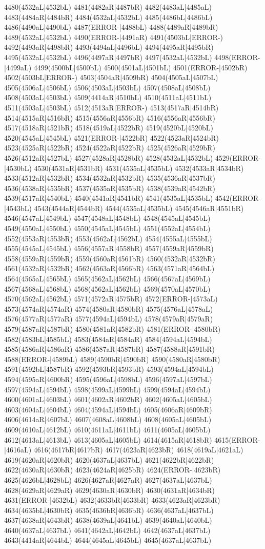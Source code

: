 4480(4532aL|4532bL) 4481(4482aR|4487bR) 4482(4483aL|4485aL) 4483(4484aR|4484bR) 4484(4532aL|4532bL) 4485(4486bL|4486bL) 4486(4490aL|4490bL) 4487(ERROR-|4488bL) 4488(4489aR|4489bR) 4489(4532aL|4532bL) 4490(ERROR-|4491aR) 4491(4503bL|ERROR-) 4492(4493aR|4498bR) 4493(4494aL|4496bL) 4494(4495aR|4495bR) 4495(4532aL|4532bL) 4496(4497aR|4497bR) 4497(4532aL|4532bL) 4498(ERROR-|4499aL) 4499(4500bL|4500bL) 4500(4501aL|4501bL) 4501(ERROR-|4502bR) 4502(4503bL|ERROR-) 4503(4504aR|4509bR) 4504(4505aL|4507bL) 4505(4506aL|4506bL) 4506(4503aL|4503bL) 4507(4508aL|4508bL) 4508(4503aL|4503bL) 4509(4414aR|4510bL) 4510(4511aL|4511bL) 4511(4503aL|4503bL) 4512(4513aR|ERROR-) 4513(4517aR|4514bR) 4514(4515aR|4516bR) 4515(4556aR|4556bR) 4516(4556aR|4556bR) 4517(4518aR|4521bR) 4518(4519aL|4522bR) 4519(4520bL|4520bL) 4520(4545aL|4545bL) 4521(ERROR-|4522bR) 4522(4523aR|4524bR) 4523(4525aR|4522bR) 4524(4522aR|4522bR) 4525(4526aR|4529bR) 4526(4512aR|4527bL) 4527(4528aR|4528bR) 4528(4532aL|4532bL) 4529(ERROR-|4530bL) 4530(4531aR|4531bR) 4531(4535aL|4535bL) 4532(4533aR|4534bR) 4533(4512aR|4532bR) 4534(4532aR|4532bR) 4535(4536aR|4537bR) 4536(4538aR|4535bR) 4537(4535aR|4535bR) 4538(4539aR|4542bR) 4539(4517aR|4540bL) 4540(4541aR|4541bR) 4541(4535aL|4535bL) 4542(ERROR-|4543bL) 4543(4544aR|4544bR) 4544(4535aL|4535bL) 4545(4546aR|4551bR) 4546(4547aL|4549bL) 4547(4548aL|4548bL) 4548(4545aL|4545bL) 4549(4550aL|4550bL) 4550(4545aL|4545bL) 4551(4552aL|4554bL) 4552(4553aR|4553bR) 4553(4562aL|4562bL) 4554(4555aL|4555bL) 4555(4545aL|4545bL) 4556(4557aR|4558bR) 4557(4559aR|4559bR) 4558(4559aR|4559bR) 4559(4560aR|4561bR) 4560(4532aR|4532bR) 4561(4532aR|4532bR) 4562(4563aR|4566bR) 4563(4571aR|4564bL) 4564(4565aL|4565bL) 4565(4562aL|4562bL) 4566(4567aL|4569bL) 4567(4568aL|4568bL) 4568(4562aL|4562bL) 4569(4570aL|4570bL) 4570(4562aL|4562bL) 4571(4572aR|4575bR) 4572(ERROR-|4573aL) 4573(4574aR|4574aR) 4574(4580aR|4580bR) 4575(4576aL|4578aL) 4576(4577aR|4577aR) 4577(4594aL|4594bL) 4578(4579aR|4579aR) 4579(4587aR|4587bR) 4580(4581aR|4582bR) 4581(ERROR-|4580bR) 4582(4583bL|4585bL) 4583(4584aR|4584aR) 4584(4594aL|4594bL) 4585(4586aR|4586aR) 4586(4587aR|4587bR) 4587(4588aR|4591bR) 4588(ERROR-|4589bL) 4589(4590bR|4590bR) 4590(4580aR|4580bR) 4591(4592bL|4587bR) 4592(4593bR|4593bR) 4593(4594aL|4594bL) 4594(4595aR|4600bR) 4595(4596aL|4598bL) 4596(4597aL|4597bL) 4597(4594aL|4594bL) 4598(4599aL|4599bL) 4599(4594aL|4594bL) 4600(4601aL|4603bL) 4601(4602aR|4602bR) 4602(4605aL|4605bL) 4603(4604aL|4604bL) 4604(4594aL|4594bL) 4605(4606aR|4609bR) 4606(4614aR|4607bL) 4607(4608aL|4608bL) 4608(4605aL|4605bL) 4609(4610aL|4612bL) 4610(4611aL|4611bL) 4611(4605aL|4605bL) 4612(4613aL|4613bL) 4613(4605aL|4605bL) 4614(4615aR|4618bR) 4615(ERROR-|4616aL) 4616(4617bR|4617bR) 4617(4623aR|4623bR) 4618(4619aL|4621aL) 4619(4620aR|4620bR) 4620(4637aL|4637bL) 4621(4622bR|4622bR) 4622(4630aR|4630bR) 4623(4624aR|4625bR) 4624(ERROR-|4623bR) 4625(4626bL|4628bL) 4626(4627aR|4627aR) 4627(4637aL|4637bL) 4628(4629aR|4629aR) 4629(4630aR|4630bR) 4630(4631aR|4634bR) 4631(ERROR-|4632bL) 4632(4633bR|4633bR) 4633(4623aR|4623bR) 4634(4635bL|4630bR) 4635(4636bR|4636bR) 4636(4637aL|4637bL) 4637(4638aR|4643bR) 4638(4639aL|4641bL) 4639(4640aL|4640bL) 4640(4637aL|4637bL) 4641(4642aL|4642bL) 4642(4637aL|4637bL) 4643(4414aR|4644bL) 4644(4645aL|4645bL) 4645(4637aL|4637bL) 